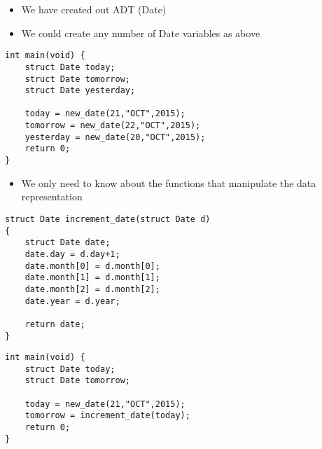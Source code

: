 \documentclass{beamer}
\begin{document}
\begin{frame}
\begin{itemize}
\item We have created out ADT (Date)
\item We could create any number of Date variables as above
\end{itemize}
\end{frame}

\begin{frame}[fragile]
\begin{block}{}
\begin{lstlisting}
int main(void) {
	struct Date today;
	struct Date tomorrow;
	struct Date yesterday;
	
	today = new_date(21,"OCT",2015);
	tomorrow = new_date(22,"OCT",2015);
	yesterday = new_date(20,"OCT",2015);
	return 0;
}
\end{lstlisting}
\end{block}
\end{frame}

\begin{frame}
\begin{itemize}
\item We only need to know about the functions that manipulate the data representation
\end{itemize}
\end{frame}

\begin{frame}[fragile]
\begin{block}{}
\begin{lstlisting}
struct Date increment_date(struct Date d)
{
    struct Date date;
    date.day = d.day+1;
    date.month[0] = d.month[0];
    date.month[1] = d.month[1];
    date.month[2] = d.month[2];
    date.year = d.year;
    
    return date;
}
\end{lstlisting}
\end{block}
\end{frame}

\begin{frame}[fragile]
\begin{block}{}
\begin{lstlisting}
int main(void) {
	struct Date today;
	struct Date tomorrow;
	
	today = new_date(21,"OCT",2015);
	tomorrow = increment_date(today);
	return 0;
}
\end{lstlisting}
\end{block}
\end{frame}
\end{document}
